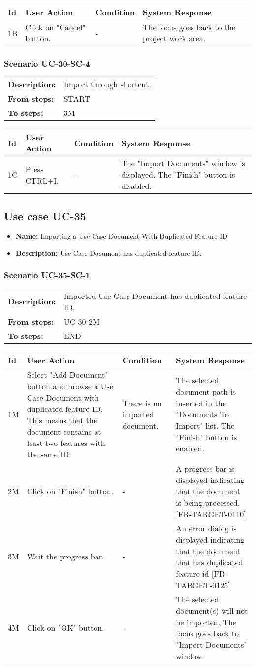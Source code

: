\documentclass[a4paper,11pt]{article}
\newcommand{\bl}{\\ \hline}
\begin{document}
\begin{tabular}{|p{0.8in}|p{1.6in}|p{1.6in}|p{1.6in}|}
\hline
Id & User Action & Condition & System Response  \bl 
1B & Click on "Cancel" button. & - & The focus goes back to the project work area. \bl 
\end{tabular}
\subsubsection*{Scenario UC-30-SC-4}
\begin{tabular}{p{1in}p{4in}}
{\bf Description:} & Import through shortcut. \\
{\bf From steps:} & START \\
{\bf To steps:} & 3M \\
\end{tabular}
 
\begin{tabular}{|p{0.8in}|p{1.6in}|p{1.6in}|p{1.6in}|}
\hline
Id & User Action & Condition & System Response  \bl 
1C & Press CTRL+I. & - & The "Import Documents" window is displayed. The "Finish" button is disabled. \bl 
\end{tabular}
\subsection*{Use case UC-35}
\begin{itemize}
\item {\bf Name: }Importing a Use Case Document With Duplicated Feature ID
\item {\bf Description: }Use Case Document has duplicated feature ID.
\end{itemize}
\subsubsection*{Scenario UC-35-SC-1}
\begin{tabular}{p{1in}p{4in}}
{\bf Description:} & Imported Use Case Document has duplicated feature ID. \\
{\bf From steps:} & UC-30-2M \\
{\bf To steps:} & END \\
\end{tabular}
 
\begin{tabular}{|p{0.8in}|p{1.6in}|p{1.6in}|p{1.6in}|}
\hline
Id & User Action & Condition & System Response  \bl 
1M & Select "Add Document" button and browse a Use Case Document with duplicated feature ID. This means that the document contains at least two features with the same ID. & There is no imported document. & The selected document path is inserted in the "Documents To Import" list. The "Finish" button is enabled. \bl 
2M & Click on "Finish" button. & - & A progress bar is displayed indicating that the document is being processed. [FR-TARGET-0110] \bl 
3M & Wait the progress bar. & - & An error dialog is displayed indicating that the document that has duplicated feature id [FR-TARGET-0125] \bl 
4M & Click on "OK" button. & - & The selected document(s) will not be imported. The focus goes back to "Import Documents" window. \bl 
\end{tabular}
\end{document}
